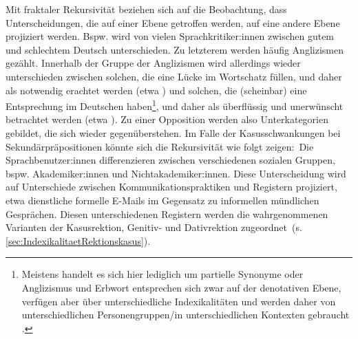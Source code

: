 Mit fraktaler Rekursivit{\"a}t beziehen sich \citet[38]{Irvine2000} auf die Beobachtung, dass Unterscheidungen, die auf einer Ebene getroffen werden, auf eine andere Ebene projiziert werden. 
Bspw. wird von vielen Sprachkritiker:innen zwischen \glqq gutem\grqq{} und \glqq schlechtem\grqq{} Deutsch unterschieden. 
Zu letzterem werden häufig Anglizismen gezählt. 
Innerhalb der Gruppe der Anglizismen wird allerdings wieder unterschieden zwischen solchen, die eine Lücke im Wortschatz füllen, und daher als notwendig erachtet werden (etwa ) und solchen, die (scheinbar) eine Entsprechung im Deutschen haben\footnote{Meistens handelt es sich hier lediglich um partielle Synonyme oder Anglizismus und Erbwort entsprechen sich zwar auf der denotativen Ebene, verfügen aber über unterschiedliche Indexikalitäten und werden daher von unterschiedlichen Personengruppen/in unterschiedlichen Kontexten gebraucht \citep[s. hierzu][]{Spitzmuller.2007}.}, und daher als überflüssig und unerwünscht betrachtet werden (etwa ). 
Zu einer Opposition werden also Unterkategorien gebildet, die sich wieder gegen{\"u}berstehen. 
Im Falle der Kasusschwankungen bei Sekund{\"a}rpr{\"a}positionen könnte sich die Rekursivit{\"a}t wie folgt zeigen:~Die Sprachbenutzer:innen differenzieren zwischen verschiedenen sozialen Gruppen, bspw. Akademiker:innen und Nichtakademiker:innen. Diese Unterscheidung wird auf Unterschiede zwischen Kommunikationspraktiken und Registern projiziert, etwa dienstliche formelle E-Mails im Gegensatz zu informellen mündlichen Gesprächen. 
Diesen unterschiedenen Registern werden die wahrgenommenen Varianten der Kasusrektion, Genitiv- und Dativrektion zugeordnet~(s. \autoref{sec:IndexikalitaetRektionskasus}).

